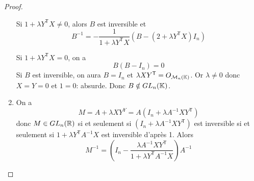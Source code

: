 \begin{proof}
\begin{enumerate}
        Si $1+\lambda Y^{\mathsf{T}}X\neq0$, alors $B$ est inversible et 
        \begin{equation}
            \boxed{B^{-1}=-\frac{1}{1+\lambda Y^{\mathsf{T}}X}\left(B-\left(2+\lambda Y^{\mathsf{T}}X\right)I_{n}\right)}
        \end{equation}

        Si $1+\lambda Y^{\mathsf{T}}X=0$, on a 
        \begin{equation}
            B\left(B-I_{n}\right)=0
        \end{equation}
        Si $B$ est inversible, on aura $B=I_{n}$ et $\lambda XY^{\mathsf{T}}=O_{\mathcal{M}_{n}(\mathbb{K})}$. Or $\lambda\neq0$ donc $X=Y=0$ et $1=0$: absurde. Donc $B\notin GL_{n}(\mathbb{K})$.

        \item On a 
        \begin{equation}
            M=A+\lambda XY^{Y}=A\left(I_{n}+\lambda A^{-1}XY^{\mathsf{T}}\right)
        \end{equation}
        donc $M\in GL_{n}(\mathbb{R})$ si et seulement si $\left(I_{n}+\lambda A^{-1}XY^{\mathsf{T}}\right)$ est inversible si et seulement si $1+\lambda Y^{\mathsf{T}}A^{-1}X$ est inversible d'après 1. Alors 
        \begin{equation}
            \boxed{M^{-1}=\left(I_{n}-\frac{\lambda A^{-1}XY^{\mathsf{T}}}{1+\lambda Y^{\mathsf{T}}A^{-1}X}\right)A^{-1}}
        \end{equation}
    \end{enumerate}
\end{proof}

